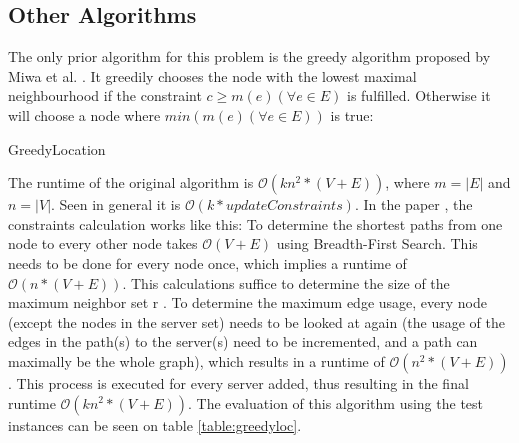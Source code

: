 \documentclass [12pt]{article}
\begin{document}
\subsection{Other Algorithms}
The only prior algorithm for this problem is the greedy algorithm proposed by
Miwa et al. \cite{mirrorserver}. It greedily chooses the node with the 
lowest maximal neighbourhood if the constraint $c\geq m(e) (\forall e \in E)$ is fulfilled. 
Otherwise it will choose a node where $min(m(e)(\forall e \in E))$ is true:
\begin{algorithm}[H]
  \caption{GreedyLocation}
\end{algorithm}
 The runtime of the original algorithm is $\mathcal O(kn^{2}*(V+E))$,
where $m = |E|$ and $n = |V|$. Seen  in general it is $\mathcal O(k * updateConstraints)$. 
In the paper \cite{mirrorserver}, the constraints calculation works like this:
To determine the shortest paths from one node to every other node takes 
$\mathcal O(V+E)$ using Breadth-First Search. This needs to be done for every node once,
which implies a runtime of $\mathcal O(n*(V+E))$. 
This calculations suffice to determine the size of the maximum neighbor set r . To determine the maximum
edge usage, every node (except the nodes in the server set) needs to be looked 
at again (the usage of the edges in the
path(s) to the server(s) need to be incremented, and a path can maximally be the whole graph), 
which results in a runtime of $\mathcal O(n^{2}*(V+E))$.   
This process is executed for every server added, thus resulting in the final runtime
$\mathcal O(kn^{2}*(V+E))$. The evaluation of this algorithm using the test instances can be seen on table 
\ref{table:greedyloc}.
\end{document}
